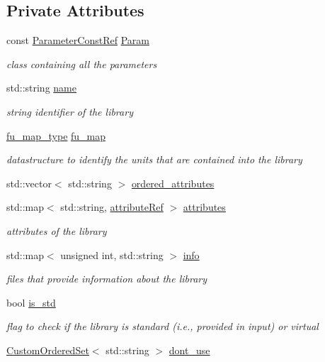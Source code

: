 \subsection*{Private Attributes}
\begin{DoxyCompactItemize}
\item 
const \hyperlink{Parameter_8hpp_a37841774a6fcb479b597fdf8955eb4ea}{Parameter\+Const\+Ref} \hyperlink{classlibrary__manager_a456f9321dfda42ab5d48c9636ab43320}{Param}
\begin{DoxyCompactList}\small\item\em class containing all the parameters \end{DoxyCompactList}\item 
std\+::string \hyperlink{classlibrary__manager_a6d92e10c68ec4a2975d832b0650c7168}{name}
\begin{DoxyCompactList}\small\item\em string identifier of the library \end{DoxyCompactList}\item 
\hyperlink{classlibrary__manager_a17941addb97906d7b41c5b0b0317fde2}{fu\+\_\+map\+\_\+type} \hyperlink{classlibrary__manager_a56275437810dccb628120827741c7822}{fu\+\_\+map}
\begin{DoxyCompactList}\small\item\em datastructure to identify the units that are contained into the library \end{DoxyCompactList}\item 
std\+::vector$<$ std\+::string $>$ \hyperlink{classlibrary__manager_ae96defe4ac96f8ce7d5c336e3b7a3adb}{ordered\+\_\+attributes}
\item 
std\+::map$<$ std\+::string, \hyperlink{library__manager_8hpp_a46399d2eacc03fb10f84fb33987ab8e3}{attribute\+Ref} $>$ \hyperlink{classlibrary__manager_aeedcfac2940fb2d4e5ae1d88bdbf089e}{attributes}
\begin{DoxyCompactList}\small\item\em attributes of the library \end{DoxyCompactList}\item 
std\+::map$<$ unsigned int, std\+::string $>$ \hyperlink{classlibrary__manager_a1dbe9b8f22a6e8f19086159723bfb0a6}{info}
\begin{DoxyCompactList}\small\item\em files that provide information about the library \end{DoxyCompactList}\item 
bool \hyperlink{classlibrary__manager_a9b6c57463b3f9c936b5907b51b6487e1}{is\+\_\+std}
\begin{DoxyCompactList}\small\item\em flag to check if the library is standard (i.\+e., provided in input) or virtual \end{DoxyCompactList}\item 
\hyperlink{classCustomOrderedSet}{Custom\+Ordered\+Set}$<$ std\+::string $>$ \hyperlink{classlibrary__manager_a6166670fafe2b957bd18c46fc0406ee2}{dont\+\_\+use}
\end{DoxyCompactItemize}



